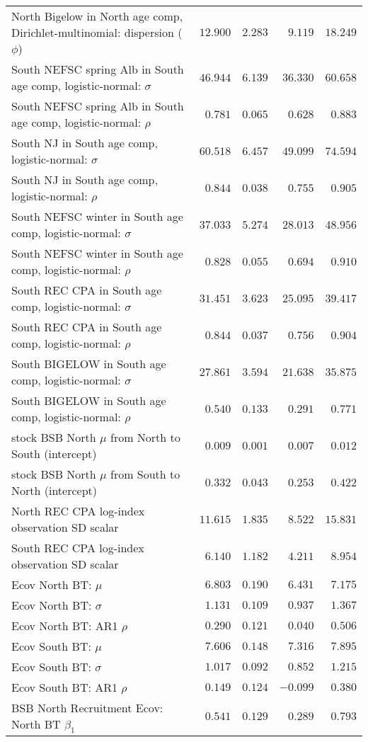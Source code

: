 \documentclass[
]{article}
\begin{document}
\begin{landscape}
\begin{longtable}[t]{lrrrr}
North Bigelow in North age comp, Dirichlet-multinomial: dispersion ($\phi$) & $12.900$ & $2.283$ & $9.119$ & $18.249$\\
South NEFSC spring Alb in South age comp, logistic-normal: $\sigma$ & $46.944$ & $6.139$ & $36.330$ & $60.658$\\
South NEFSC spring Alb in South age comp, logistic-normal: $\rho$ & $0.781$ & $0.065$ & $0.628$ & $0.883$\\
\addlinespace
South NJ in South age comp, logistic-normal: $\sigma$ & $60.518$ & $6.457$ & $49.099$ & $74.594$\\
South NJ in South age comp, logistic-normal: $\rho$ & $0.844$ & $0.038$ & $0.755$ & $0.905$\\
South NEFSC winter in South age comp, logistic-normal: $\sigma$ & $37.033$ & $5.274$ & $28.013$ & $48.956$\\
South NEFSC winter in South age comp, logistic-normal: $\rho$ & $0.828$ & $0.055$ & $0.694$ & $0.910$\\
South REC CPA in South age comp, logistic-normal: $\sigma$ & $31.451$ & $3.623$ & $25.095$ & $39.417$\\
\addlinespace
South REC CPA in South age comp, logistic-normal: $\rho$ & $0.844$ & $0.037$ & $0.756$ & $0.904$\\
South BIGELOW in South age comp, logistic-normal: $\sigma$ & $27.861$ & $3.594$ & $21.638$ & $35.875$\\
South BIGELOW in South age comp, logistic-normal: $\rho$ & $0.540$ & $0.133$ & $0.291$ & $0.771$\\
stock BSB North $\mu$ from North to South (intercept) & $0.009$ & $0.001$ & $0.007$ & $0.012$\\
stock BSB North $\mu$ from South to North (intercept) & $0.332$ & $0.043$ & $0.253$ & $0.422$\\
\addlinespace
North REC CPA log-index observation SD scalar & $11.615$ & $1.835$ & $8.522$ & $15.831$\\
South REC CPA log-index observation SD scalar & $6.140$ & $1.182$ & $4.211$ & $8.954$\\
Ecov North BT: $\mu$ & $6.803$ & $0.190$ & $6.431$ & $7.175$\\
Ecov North BT: $\sigma$ & $1.131$ & $0.109$ & $0.937$ & $1.367$\\
Ecov North BT: AR1 $\rho$ & $0.290$ & $0.121$ & $0.040$ & $0.506$\\
\addlinespace
Ecov South BT: $\mu$ & $7.606$ & $0.148$ & $7.316$ & $7.895$\\
Ecov South BT: $\sigma$ & $1.017$ & $0.092$ & $0.852$ & $1.215$\\
Ecov South BT: AR1 $\rho$ & $0.149$ & $0.124$ & $-0.099$ & $0.380$\\
BSB North Recruitment Ecov: North BT $\beta_1$ & $0.541$ & $0.129$ & $0.289$ & $0.793$\\*
\end{longtable}
\end{landscape}
\end{document}
